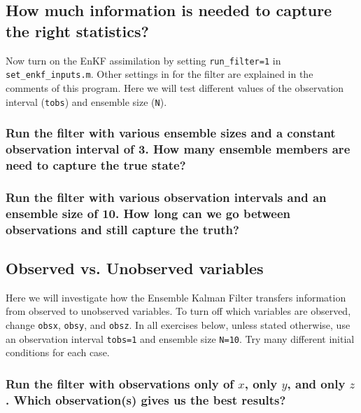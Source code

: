 
\subsection{How much information is needed to capture the right statistics?}

Now turn on the EnKF assimilation by setting \texttt{run\_filter=1} in \texttt{set\_enkf\_inputs.m}. 
Other settings in for the filter are explained in the comments of this program. 
Here we will test different values of the observation interval (\texttt{tobs}) and ensemble size (\texttt{N}).

\subsubsection{Run the filter with various ensemble sizes and a constant observation interval of 3. How many ensemble members are need to capture the true state?}
\subsubsection{Run the filter with various observation intervals and an ensemble size of 10. How long can we go between observations and still capture the truth?}

\subsection{Observed vs. Unobserved variables}

Here we will investigate how the Ensemble Kalman Filter transfers information from observed to unobserved variables.
To turn off which variables are observed, change \texttt{obsx}, \texttt{obsy}, and \texttt{obsz}. 
In all exercises below, unless stated otherwise, use an observation interval \texttt{tobs=1} and ensemble size \texttt{N=10}. 
Try many different initial conditions for each case. 

\subsubsection{Run the filter with observations only of $x$, only $y$, and only $z$. Which observation(s) gives us the best results?} 



